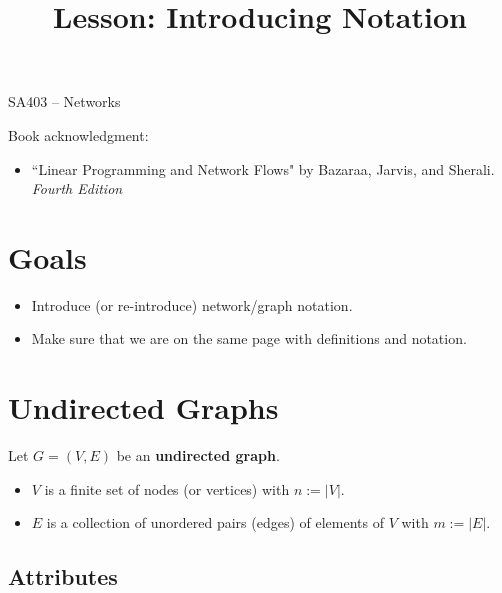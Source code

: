 \documentclass[12pt]{article}
\makeatletter
\theoremstyle{definition}
\newcommand{\graphbox}[5]%
{
\begin{tikzpicture}
     [>=latex,scale=#5]
     
     \draw [->,very thick] (#1, 0) -- (#2, 0) node[right] {$x$};
     \draw [->,very thick] (0, #3) -- (0, #4) node[above] {$y$};
     
     \draw[step=1cm,thick,dotted] (#1,#3) grid (#2,#4);
   \end{tikzpicture}
   }
\renewcommand{\maketitle}{
  \noindent SA403 -- Networks \\

  \begin{center}\Large{\textbf{\@title}}\end{center}
}
\makeatother
\begin{document}

\title{Lesson: Introducing Notation}


\maketitle



Book acknowledgment:
\begin{itemize}
	\item[] ``Linear Programming and Network Flows" by Bazaraa, Jarvis, and Sherali. \emph{Fourth Edition}
\end{itemize}
\section*{Goals}
\begin{itemize}
\item  Introduce (or re-introduce) network/graph notation.
\item Make sure that we are on the same page with definitions and notation.
\end{itemize}

\section{Undirected Graphs}

Let $G = (V,E)$ be an \textbf{undirected graph}.
\begin{itemize}
	\item[] $V$ is a finite set of nodes (or vertices) with $n:= |V|$.
	\item[] $E$ is a collection of unordered pairs (edges) of elements of $V$ with $m:=|E|$.
\end{itemize}
 
\subsection*{Attributes}
\end{document}
